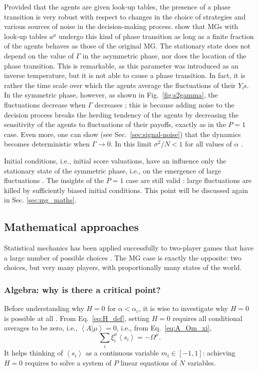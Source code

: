 \documentclass[aps,twocolumn,nofootinbib,sortedaddress,reprint]{revtex4-1}
\begin{document}
Provided that the agents are given look-up tables, the presence of a
phase transition is very robust with respect to changes in the choice
of strategies and various sources of noise in the decision-making process.
 \textcite{galla2008transition} show that MGs with look-up
tables $a^\mu$ undergo this kind of phase transition as long as a
finite fraction of the agents behaves as those of the original MG. The
stationary state does not depend on the value of $\Gamma$
 in the asymmetric phase, nor does the location of the phase transition. This is remarkable, as this
parameter was introduced as an inverse temperature, but it is not able to cause a phase transition. In fact,
it is rather the time scale over which the agents average the
fluctuations of their $Y_i$s. In the symmetric phase, however, as
shown in Fig.\ \ref{fig:s2gamma}, the fluctuations decrease when
$\Gamma$ decreases \cite{DosiExp,Oxf1}; this is because adding noise
to the decision process breaks the herding tendency of the agents by
decreasing the sensitivity of the agents to fluctuations of their
payoffs, exactly as in the $P=1$ case. Even more, one can show (see Sec.~\ref{sec:signal-noise})
that the dynamics becomes deterministic when $\Gamma\to0$. In this
limit $\sigma^2/N<1$ for all values of $\alpha$ \cite{MC01}.

Initial conditions, i.e., initial score valuations, have an influence
only the stationary state of the symmetric phase, i.e., on the
emergence of large fluctuations \cite{dhulst2000strategy,Moro1}. The
insights of the $P=1$ case are still valid \cite{MarsiliMinMaj}: large
fluctuations are killed by sufficiently biased initial
conditions. This point will be discussed again in Sec.
\ref{sec:mg_maths}.


\subsection{Mathematical approaches}
Statistical mechanics has been applied successfully to two-player
games that have a large number of possible choices
\cite{galla2013complex,berg1998matrix,berg2000statistical}. The MG
case is exactly the opposite: two choices, but very many players, with
proportionally many states of the world.

\label{sec:mg_maths}
\subsubsection{Algebra: why is there a critical point?}
\label{sec:mg_alg}
Before understanding why $H=0$ for $\alpha<\alpha_c$, it is wise to
investigate why $H=0$ is possible at all \cite{MC01}. From Eq.~\eqref{eq:H_def},
setting $H=0$ requires all conditional averages to be zero, i.e.,
$\left<A|\mu\right>=0$, i.e., from Eq.\ \eqref{eq:A_Om_xi},
\begin{equation}\label{eq:Amu_eq_Om}
\sum_i\xi_i^\mu \left<s_i\right>=-\Omega^\mu.
\end{equation}
It helps thinking of $\left<s_i\right>$ as a continuous variable
$m_i\in[-1,1]$: achieving $H=0$ requires to solve a system of $P$
linear equations of $N$ variables.
\end{document}
